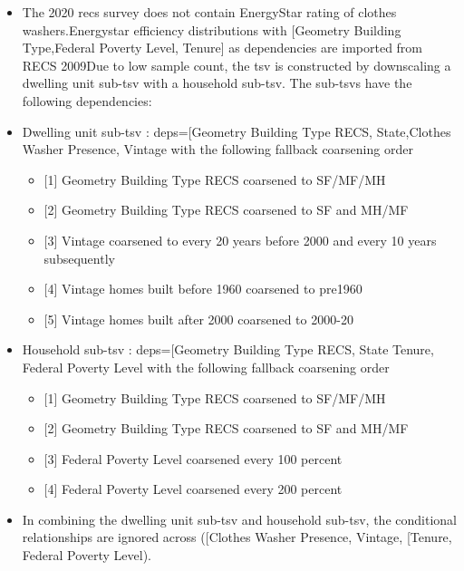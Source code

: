 \begin{itemize}
 
\item
  The 2020 recs survey does not contain EnergyStar rating of clothes
  washers.Energystar efficiency distributions with {[}Geometry Building
  Type,Federal Poverty Level, Tenure{]} as dependencies are imported
  from RECS 2009Due to low sample count, the tsv is constructed by
  downscaling a dwelling unit sub-tsv with a household sub-tsv. The
  sub-tsvs have the following dependencies:
\item
  Dwelling unit sub-tsv : deps={[}\textquotesingle Geometry Building
  Type RECS\textquotesingle,
  \textquotesingle State\textquotesingle,\textquotesingle Clothes Washer
  Presence\textquotesingle, \textquotesingle Vintage\textquotesingle{]}
  with the following fallback coarsening order

  \begin{itemize}
   
  \item
    {[}1{]} Geometry Building Type RECS coarsened to SF/MF/MH
  \item
    {[}2{]} Geometry Building Type RECS coarsened to SF and MH/MF
  \item
    {[}3{]} Vintage coarsened to every 20 years before 2000 and every 10
    years subsequently
  \item
    {[}4{]} Vintage homes built before 1960 coarsened to pre1960
  \item
    {[}5{]} Vintage homes built after 2000 coarsened to 2000-20
  \end{itemize}
\item
  Household sub-tsv : deps={[}\textquotesingle Geometry Building Type
  RECS\textquotesingle, \textquotesingle State\textquotesingle{}
  \textquotesingle Tenure\textquotesingle, \textquotesingle Federal
  Poverty Level\textquotesingle{]} with the following fallback
  coarsening order

  \begin{itemize}
   
  \item
    {[}1{]} Geometry Building Type RECS coarsened to SF/MF/MH
  \item
    {[}2{]} Geometry Building Type RECS coarsened to SF and MH/MF
  \item
    {[}3{]} Federal Poverty Level coarsened every 100 percent
  \item
    {[}4{]} Federal Poverty Level coarsened every 200 percent
  \end{itemize}
\item
  In combining the dwelling unit sub-tsv and household sub-tsv, the
  conditional relationships are ignored across
  ({[}\textquotesingle Clothes Washer Presence\textquotesingle,
  \textquotesingle Vintage\textquotesingle{]},
  {[}\textquotesingle Tenure\textquotesingle, \textquotesingle Federal
  Poverty Level\textquotesingle{]}).
\end{itemize}

